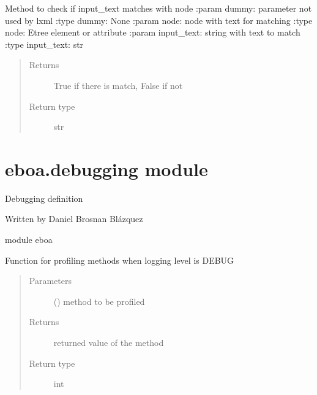 \begin{fulllineitems}
\label{\detokenize{eboa.triggering:eboa.triggering.xpath_functions.match}}
Method to check if input\_text matches with node
:param dummy: parameter not used by lxml
:type dummy: None
:param node: node with text for matching
:type node: Etree element or attribute
:param input\_text: string with text to match
:type input\_text: str
\begin{quote}\begin{description}
\item[{Returns}] \leavevmode
True if there is match, False if not

\item[{Return type}] \leavevmode
str

\end{description}\end{quote}

\end{fulllineitems}



\section{eboa.debugging module}
\label{\detokenize{eboa:module-eboa.debugging}}\label{\detokenize{eboa:eboa-debugging-module}}
Debugging definition

Written by Daniel Brosnan Blázquez

module eboa

\begin{fulllineitems}
\label{\detokenize{eboa:eboa.debugging.debug}}
Function for profiling methods when logging level is DEBUG
\begin{quote}\begin{description}
\item[{Parameters}] \leavevmode
{} () \textendash{} method to be profiled

\item[{Returns}] \leavevmode
returned value of the method

\item[{Return type}] \leavevmode
int

\end{description}\end{quote}

\end{fulllineitems}

